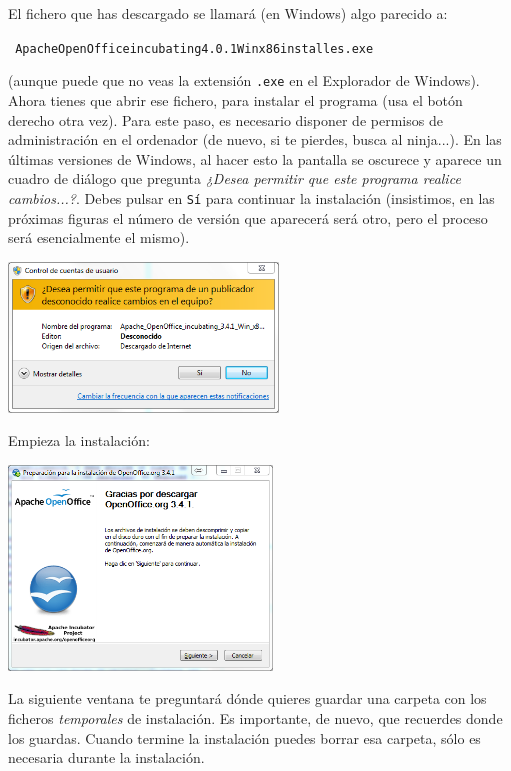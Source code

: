 \documentclass[10pt,a4paper]{article}\usepackage[]{graphicx}\usepackage[]{color}
\newcounter {cont01}
\begin{document}
El fichero que has descargado se llamará (en Windows) algo parecido a:
\begin{center}
{\tt
Apache{\textunderscore}OpenOffice{\textunderscore}incubating{\textunderscore}4.0.1{\textunderscore}Winx{\textunderscore}86{\textunderscore}install{\textunderscore}es.exe}
\end{center}
(aunque puede que no veas la extensión {\tt .exe} en el Explorador de Windows). Ahora tienes que
abrir ese fichero, para instalar el programa (usa el botón derecho otra vez).  Para este paso, es
necesario disponer de permisos de administración en el ordenador (de nuevo, si te pierdes, busca al ninja...). En las últimas versiones de Windows, al hacer esto la pantalla se oscurece y aparece un
cuadro de diálogo que pregunta {\em ¿Desea permitir que este programa realice cambios...?}. Debes
pulsar en {\tt Sí} para continuar la instalación (insistimos, en las próximas figuras el número de
versión que aparecerá será otro, pero el proceso será esencialmente el mismo).
    \begin{center}
    \includegraphics[height=4cm]{../fig/Tut00-WebOpenOffice-03.png}
    \end{center}
Empieza la instalación:
    \begin{center}
    \includegraphics[width=7cm]{../fig/Tut00-WebOpenOffice-04.png}
    \end{center}
La siguiente ventana te preguntará dónde quieres guardar una carpeta con los ficheros {\em
temporales} de instalación. Es importante, de nuevo, que recuerdes donde los guardas. Cuando
termine la instalación puedes borrar esa carpeta, sólo es necesaria durante la instalación.
\end{document}
